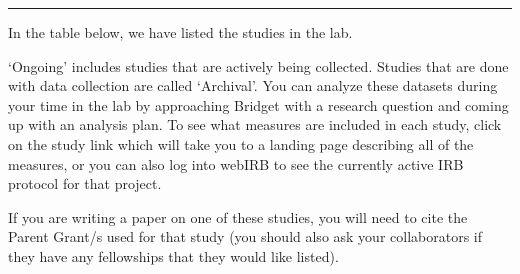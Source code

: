 \documentclass[]{book}
\begin{document}
\begin{center}\rule{0.5\linewidth}{0.5pt}\end{center}

In the table below, we have listed the studies in the lab.

`Ongoing' includes studies that are actively being collected. Studies that are done with data collection are called `Archival'. You can analyze these datasets during your time in the lab by approaching Bridget with a research question and coming up with an analysis plan. To see what measures are included in each study, click on the study link which will take you to a landing page describing all of the measures, or you can also log into webIRB to see the currently active IRB protocol for that project.

If you are writing a paper on one of these studies, you will need to cite the Parent Grant/s used for that study (you should also ask your collaborators if they have any fellowships that they would like listed).
\end{document}
